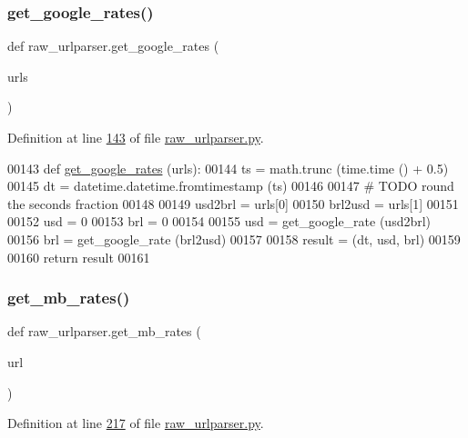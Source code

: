 \subsubsection{\texorpdfstring{get\+\_\+google\+\_\+rates()}{get\_google\_rates()}}
{\footnotesize\ttfamily def raw\+\_\+urlparser.\+get\+\_\+google\+\_\+rates (\begin{DoxyParamCaption}\item[{}]{urls }\end{DoxyParamCaption})}



Definition at line \hyperlink{raw__urlparser_8py_source_l00143}{143} of file \hyperlink{raw__urlparser_8py_source}{raw\+\_\+urlparser.\+py}.


\begin{DoxyCode}
00143 \textcolor{keyword}{def }\hyperlink{namespaceraw__urlparser_aa5905f1b040de4865980526ac3c6a16c}{get\_google\_rates} (urls):
00144     ts = math.trunc (time.time () + 0.5)
00145     dt = datetime.datetime.fromtimestamp (ts)
00146     
00147     \textcolor{comment}{# TODO round the seconds fraction}
00148     
00149     usd2brl = urls[0]
00150     brl2usd = urls[1]
00151     
00152     usd = 0
00153     brl = 0
00154     
00155     usd = get\_google\_rate (usd2brl)
00156     brl = get\_google\_rate (brl2usd)
00157     
00158     result = (dt, usd, brl)
00159     
00160     \textcolor{keywordflow}{return} result
00161         
\end{DoxyCode}
\mbox{\label{namespaceraw__urlparser_ae2341143e866401a993a5a964610f7a6}} 
\subsubsection{\texorpdfstring{get\+\_\+mb\+\_\+rates()}{get\_mb\_rates()}}
{\footnotesize\ttfamily def raw\+\_\+urlparser.\+get\+\_\+mb\+\_\+rates (\begin{DoxyParamCaption}\item[{}]{url }\end{DoxyParamCaption})}



Definition at line \hyperlink{raw__urlparser_8py_source_l00217}{217} of file \hyperlink{raw__urlparser_8py_source}{raw\+\_\+urlparser.\+py}.


